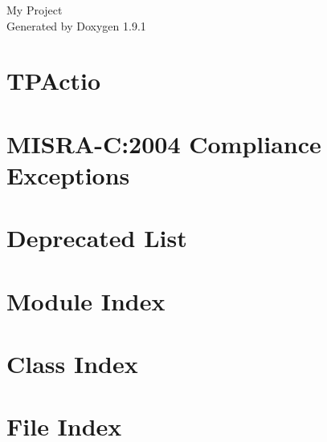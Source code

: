 \let\mypdfximage\pdfximage\def\pdfximage{\immediate\mypdfximage}\documentclass[twoside]{book}
\newcommand{\+}{\discretionary{\mbox{\scriptsize$\hookleftarrow$}}{}{}}
\newcommand{\clearemptydoublepage}{%
  \newpage{\pagestyle{empty}\cleardoublepage}%
}
\begin{document}
\raggedbottom

\hypersetup{pageanchor=false,
             bookmarksnumbered=true,
             pdfencoding=unicode
            }
\begin{titlepage}
\vspace*{7cm}
\begin{center}%
{\Large My Project }\\
\vspace*{1cm}
{\large Generated by Doxygen 1.9.1}\\
\end{center}
\end{titlepage}
\clearemptydoublepage
{}
\tableofcontents
\clearemptydoublepage
{}
\hypersetup{pageanchor=true}

\chapter{TPActio}
\label{md_README}

\chapter{MISRA-\/C\+:2004 Compliance Exceptions}
\label{CMSIS_MISRA_Exceptions}

\chapter{Deprecated List}
\label{deprecated}

\chapter{Module Index}

\chapter{Class Index}

\chapter{File Index}

\end{document}
